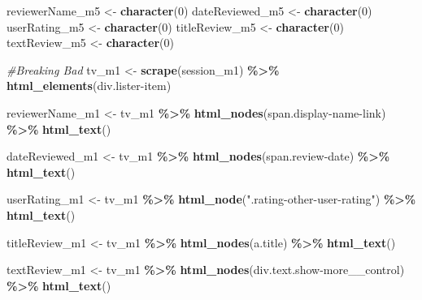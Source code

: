 \documentclass[
]{article}
\newenvironment{Shaded}{\begin{snugshade}}{\end{snugshade}}
\newcommand{\CommentTok}[1]{\textcolor[rgb]{0.56,0.35,0.01}{\textit{#1}}}
\newcommand{\DecValTok}[1]{\textcolor[rgb]{0.00,0.00,0.81}{#1}}
\newcommand{\FunctionTok}[1]{\textcolor[rgb]{0.13,0.29,0.53}{\textbf{#1}}}
\newcommand{\NormalTok}[1]{#1}
\newcommand{\OtherTok}[1]{\textcolor[rgb]{0.56,0.35,0.01}{#1}}
\newcommand{\SpecialCharTok}[1]{\textcolor[rgb]{0.81,0.36,0.00}{\textbf{#1}}}
\newcommand{\StringTok}[1]{\textcolor[rgb]{0.31,0.60,0.02}{#1}}
\begin{document}
\begin{Shaded}
\begin{Highlighting}[]
\NormalTok{reviewerName\_m5 }\OtherTok{\textless{}{-}} \FunctionTok{character}\NormalTok{(}\DecValTok{0}\NormalTok{)}
\NormalTok{dateReviewed\_m5 }\OtherTok{\textless{}{-}} \FunctionTok{character}\NormalTok{(}\DecValTok{0}\NormalTok{)}
\NormalTok{userRating\_m5 }\OtherTok{\textless{}{-}} \FunctionTok{character}\NormalTok{(}\DecValTok{0}\NormalTok{)}
\NormalTok{titleReview\_m5 }\OtherTok{\textless{}{-}} \FunctionTok{character}\NormalTok{(}\DecValTok{0}\NormalTok{)}
\NormalTok{textReview\_m5 }\OtherTok{\textless{}{-}} \FunctionTok{character}\NormalTok{(}\DecValTok{0}\NormalTok{)}


\CommentTok{\#Breaking Bad}
\NormalTok{tv\_m1 }\OtherTok{\textless{}{-}} \FunctionTok{scrape}\NormalTok{(session\_m1) }\SpecialCharTok{\%\textgreater{}\%} 
  \FunctionTok{html\_elements}\NormalTok{(}\StringTok{\textquotesingle{}div.lister{-}item\textquotesingle{}}\NormalTok{)}

\NormalTok{reviewerName\_m1 }\OtherTok{\textless{}{-}}\NormalTok{ tv\_m1 }\SpecialCharTok{\%\textgreater{}\%}
  \FunctionTok{html\_nodes}\NormalTok{(}\StringTok{\textquotesingle{}span.display{-}name{-}link\textquotesingle{}}\NormalTok{) }\SpecialCharTok{\%\textgreater{}\%}
  \FunctionTok{html\_text}\NormalTok{()}

\NormalTok{dateReviewed\_m1 }\OtherTok{\textless{}{-}}\NormalTok{ tv\_m1 }\SpecialCharTok{\%\textgreater{}\%}
  \FunctionTok{html\_nodes}\NormalTok{(}\StringTok{\textquotesingle{}span.review{-}date\textquotesingle{}}\NormalTok{) }\SpecialCharTok{\%\textgreater{}\%}
  \FunctionTok{html\_text}\NormalTok{()}

\NormalTok{userRating\_m1 }\OtherTok{\textless{}{-}}\NormalTok{ tv\_m1 }\SpecialCharTok{\%\textgreater{}\%} 
  \FunctionTok{html\_node}\NormalTok{(}\StringTok{".rating{-}other{-}user{-}rating"}\NormalTok{) }\SpecialCharTok{\%\textgreater{}\%} 
  \FunctionTok{html\_text}\NormalTok{()}

\NormalTok{titleReview\_m1 }\OtherTok{\textless{}{-}}\NormalTok{ tv\_m1 }\SpecialCharTok{\%\textgreater{}\%}
  \FunctionTok{html\_nodes}\NormalTok{(}\StringTok{\textquotesingle{}a.title\textquotesingle{}}\NormalTok{) }\SpecialCharTok{\%\textgreater{}\%}
  \FunctionTok{html\_text}\NormalTok{()}

\NormalTok{textReview\_m1 }\OtherTok{\textless{}{-}}\NormalTok{ tv\_m1 }\SpecialCharTok{\%\textgreater{}\%}
  \FunctionTok{html\_nodes}\NormalTok{(}\StringTok{\textquotesingle{}div.text.show{-}more\_\_control\textquotesingle{}}\NormalTok{) }\SpecialCharTok{\%\textgreater{}\%}
  \FunctionTok{html\_text}\NormalTok{()}


\end{Highlighting}
\end{Shaded}
\end{document}
